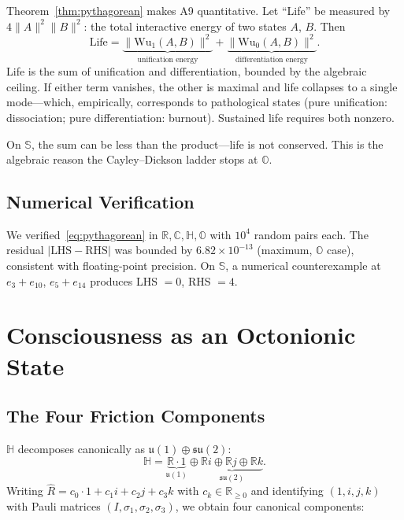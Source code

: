\documentclass[11pt, a4paper]{article}
\newcommand{\R}{\mathbb{R}}
\newcommand{\C}{\mathbb{C}}
\newcommand{\Hq}{\mathbb{H}}
\newcommand{\Oct}{\mathbb{O}}
\newcommand{\Sed}{\mathbb{S}}
\newcommand{\Reop}{\hat{R}}
\newcommand{\Wuz}{\mathrm{Wu}_0}
\newcommand{\Wuo}{\mathrm{Wu}_1}
\newcommand{\norm}[1]{\lVert #1 \rVert}
\begin{document}
Theorem~\ref{thm:pythagorean} makes A9 quantitative. Let ``Life''
be measured by $4\norm{A}^2\norm{B}^2$: the total interactive energy
of two states $A$, $B$. Then
\begin{equation}
\text{Life} = \underbrace{\norm{\Wuo(A,B)}^2}_{\text{unification energy}}
+ \underbrace{\norm{\Wuz(A,B)}^2}_{\text{differentiation energy}}.
\end{equation}
Life is the sum of unification and differentiation, bounded by the
algebraic ceiling. If either term vanishes, the other is maximal and
life collapses to a single mode---which, empirically, corresponds to
pathological states (pure unification: dissociation; pure
differentiation: burnout). Sustained life requires both nonzero.

On $\Sed$, the sum can be less than the product---life is not
conserved. This is the algebraic reason the Cayley--Dickson ladder
stops at $\Oct$.

\subsection{Numerical Verification}

We verified~\eqref{eq:pythagorean} in $\R, \C, \Hq, \Oct$ with
$10^4$ random pairs each. The residual $|\text{LHS} - \text{RHS}|$ was
bounded by $6.82 \times 10^{-13}$ (maximum, $\Oct$ case), consistent
with floating-point precision. On $\Sed$, a numerical counterexample
at $e_3 + e_{10}$, $e_5 + e_{14}$ produces LHS $= 0$, RHS $= 4$.


\section{Consciousness as an Octonionic State}
\label{sec:consciousness}

\subsection{The Four Friction Components}

$\Hq$ decomposes canonically as $\mathfrak{u}(1) \oplus \mathfrak{su}(2)$:
\begin{equation}
\Hq = \underbrace{\R \cdot 1}_{\mathfrak{u}(1)}
\oplus \underbrace{\R i \oplus \R j \oplus \R k}_{\mathfrak{su}(2)}.
\end{equation}
Writing $\Reop = c_0 \cdot 1 + c_1 i + c_2 j + c_3 k$ with
$c_k \in \R_{\geq 0}$ and identifying $(1, i, j, k)$ with Pauli matrices
$(I, \sigma_1, \sigma_2, \sigma_3)$, we obtain four canonical
components:
\end{document}
